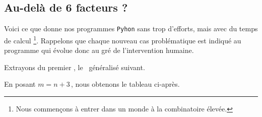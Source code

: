 \subsection{Au-delà de 6 facteurs ?}

\leavevmode
\smallskip

Voici ce que donne nos programmes \verb#Pyhon# sans trop d'efforts, mais avec du temps de calcul 
\footnote{
	Nous commençons à entrer dans un monde à la combinatoire élevée.
}.
Rappelons que chaque nouveau cas problématique est indiqué au programme qui évolue donc au gré de l'intervention humaine.








%
\begin{center}
\end{center}

Extrayons du premier \sftab[], le \sftab\ généralisé suivant.
%
\begin{center}
\end{center}

\newpage
En posant $m = n + 3$\,, nous obtenons le tableau ci-après.
%
\begin{center}
\end{center}


